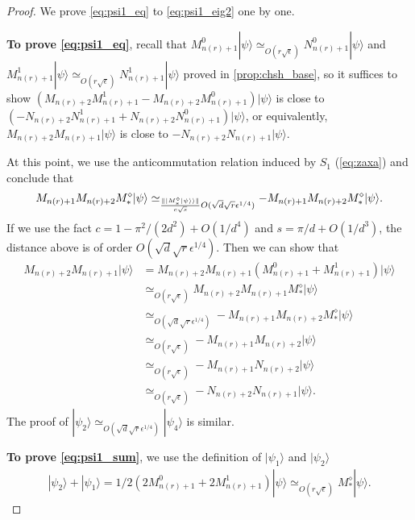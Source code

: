 \documentclass[11pt,letterpaper]{article}
\newcommand{\ket}[1]{|#1\rangle}
\DeclarePairedDelimiter{\norm}{\lVert}{\rVert}
\newcommand{\1}{\mathbb{1}}
\newcommand{\nr}{n(r)}
\newcommand{\se}{\sqrt{\epsilon}}
\newcommand{\qe}{\epsilon^{1/4}}
\newcommand{\sd}{\sqrt{d}}
\newcommand{\sr}{\sqrt{r}}
\newcommand{\appd}[1]{\simeq_{#1}}
\theoremstyle{definition}
\begin{document}
\begin{proof}
	We prove \cref{eq:psi1_eq} to \cref{eq:psi1_eig2} one by one.
	
	\textbf{To prove \cref{eq:psi1_eq}}, 
	recall that $M_{\nr+1}^0 \ket{\psi} \appd{O(r\se)} N_{\nr+1}^0 \ket{\psi}$ 
	and $M_{\nr+1}^1 \ket{\psi} \appd{O(r\se)} N_{\nr+1}^1 \ket{\psi}$ proved in \cref{prop:chsh_base},
	so it suffices to show
	$(M_{\nr+2}M_{\nr+1}^1 - M_{\nr+2}M_{\nr+1}^0) \ket{\psi}$ is close to $(- N_{\nr+2}N_{\nr+1}^1+N_{\nr+2}N_{\nr+1}^0)\ket{\psi}$,
	or equivalently,
	$M_{\nr+2}M_{\nr+1} \ket{\psi}$ is close to $-N_{\nr+2}N_{\nr+1} \ket{\psi}$.
	
	At this point, we use the anticommutation relation induced by $S_1$ (\cref{eq:zaxa}) and conclude that 
	\begin{align}
		M_{\nr+1}M_{\nr+2} M_\ast^\diamond \ket{\psi} \appd{\frac{\norm{\ket{M_\ast^\diamond\ket{\psi}}}}{c\sqrt{s}}O(\sd\sr\qe)} -M_{\nr+1}M_{\nr+2} M_\ast^\diamond \ket{\psi}.
	\end{align}
	If we use the fact $c = 1 - \pi^2/(2d^2) + O(1/d^4)$ and $s = \pi/d + O(1/d^3)$, the distance above is of order $O(\sd \sr \qe)$.
	Then we can show that 
	\begin{align*}
		M_{\nr+2}M_{\nr+1}\ket{\psi} &= M_{\nr+2}M_{\nr+1}(M_{\nr+1}^0 + M_{\nr+1}^1)\ket{\psi} \\
			&\appd{O(r\se)} M_{\nr+2}M_{\nr+1} M_\ast^\diamond \ket{\psi} \\
			&\appd{O(\sd \sr \qe)} -M_{\nr+1}M_{\nr+2} M_\ast^\diamond \ket{\psi}\\
			&\appd{O(r\se)} -M_{\nr+1}M_{\nr+2} \ket{\psi} \\
			&\appd{O(r\se)} -M_{\nr+1} N_{\nr+2} \ket{\psi} \\
			&\appd{O(r\se)} -N_{\nr+2} N_{\nr+1} \ket{\psi}.
	\end{align*}
	The proof of $\ket{\psi_2} \appd{O(\sd \sr \qe)} \ket{\psi_4}$ is similar.
	
	\textbf{To prove \cref{eq:psi1_sum}}, we use the definition of $\ket{\psi_1}$ and $\ket{\psi_2}$
	\begin{align}
		\ket{\psi_2} + \ket{\psi_1} = 1/2( 2M_{\nr+1}^0 + 2M_{\nr+1}^1) \ket{\psi} \appd{O(r\se)} M_\ast^\diamond \ket{\psi}.
	\end{align}
	

\end{proof}
\end{document}

